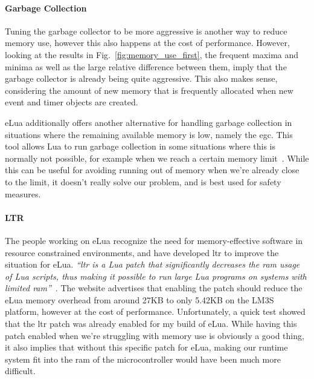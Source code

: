 \paragraph{Garbage Collection} Tuning the garbage collector to be more aggressive is another way to reduce memory use, however this also happens at the cost of performance. However, looking at the results in Fig.~\ref{fig:memory_use_first}, the frequent maxima and minima as well as the large relative difference between them, imply that the garbage collector is already being quite aggressive. This also makes sense, considering the amount of new memory that is frequently allocated when new event and timer objects are created.

eLua additionally offers another alternative for handling garbage collection in situations where the remaining available memory is low, namely the \gls{egc}. This tool allows Lua to run garbage collection in some situations where this is normally not possible, for example when we reach a certain memory limit~\cite{website:elua_egc}. While this can be useful for avoiding running out of memory when we're already close to the limit, it doesn't really solve our problem, and is best used for safety measures.

\paragraph{LTR} The people working on eLua recognize the need for memory-effective software in resource constrained environments, and have developed \gls{ltr} to improve the situation for eLua. \emph{``\gls{ltr} is a Lua patch that significantly decreases the \gls{ram} usage of Lua scripts, thus making it possible to run large Lua programs on systems with limited \gls{ram}''}~\cite{website:elua_ltr}. The website advertises that enabling the patch should reduce the eLua memory overhead from around 27KB to only 5.42KB on the LM3S platform, however at the cost of performance. Unfortunately, a quick test showed that the \gls{ltr} patch was already enabled for my build of eLua. While having this patch enabled when we're struggling with memory use is obviously a good thing, it also implies that without this specific patch for eLua, making our runtime system fit into the \gls{ram} of the microcontroller would have been much more difficult.

